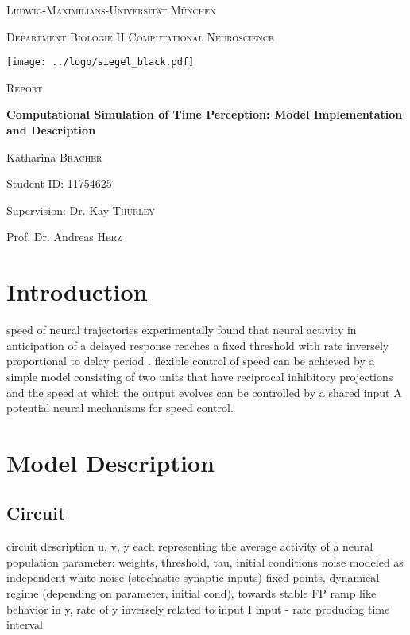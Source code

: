 \documentclass[9pt]{article}
\begin{document}

\begin{titlepage}
	\centering
	{\scshape\LARGE Ludwig-Maximilians-Universität München \par}
	{\scshape\large Department Biologie II Computational Neuroscience \par}
	\vspace{0.9cm}
	\texttt{[image: ../logo/siegel\_black.pdf]}\par
	\vspace{1.1cm}
	{\scshape\LARGE Report \par}
	\vspace{0.2cm}
	{\huge\bfseries Computational Simulation of Time Perception: Model Implementation and Description \par}
	\vspace{1.1cm}
	{\Large Katharina \textsc{Bracher} \par}
	{Student ID: 11754625 \par}
	\vspace{0.6cm}
	{\Large Supervision: Dr. Kay \textsc{Thurley} \par}
	{\Large Prof. Dr. Andreas \textsc{Herz} \par}
\end{titlepage}


\normalsize
\tableofcontents

\section{Introduction}
speed of neural trajectories
experimentally found that neural activity in anticipation of a delayed response reaches a fixed threshold with rate inversely proportional to delay period \cite{Wang2018}.
flexible control of speed 
can be achieved by a simple model consisting of two units that have reciprocal inhibitory projections and the speed at which the output evolves can be controlled by a shared input
A potential neural mechanisms for speed control.
\section{Model Description}
\subsection{Circuit}
circuit description
u, v, y each representing the average activity of a neural population
parameter: weights, threshold, tau, initial conditions
noise modeled as independent white noise (stochastic synaptic inputs)
fixed points, dynamical regime (depending on parameter, initial cond), towards stable FP ramp like behavior in y, rate of y inversely related to input I 
input - rate
producing time interval 
\end{document}
